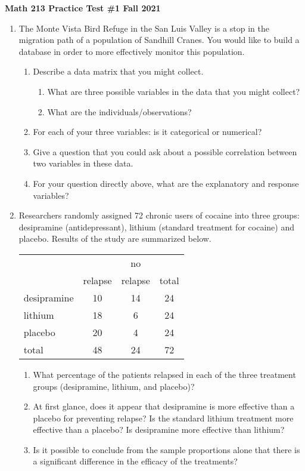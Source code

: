 \documentclass[11pt,fullpage]{amsart}
\begin{document}
\textbf{Math 213 \quad\ddag\quad Practice Test \#1 \quad\ddag\quad Fall 2021}

\hrulefill
\medskip
\begin{enumerate}

\item The Monte Vista Bird Refuge in the San Luis Valley is a stop in the migration path of a population of Sandhill Cranes. You would like to build a database in order to more effectively monitor this population.
\begin{enumerate}
\item Describe a data matrix that you might collect.
  \begin{enumerate}
  \item What are three possible variables in the data that you might collect?
    \item What are the individuals/observations?
\end{enumerate}
\item For each of your three variables: is it categorical or numerical?

\item Give a question that you could ask about a possible correlation between two variables in these data. 

\item For your question directly above, what are the explanatory and response variables?

\end{enumerate}

\vfill

\item Researchers randomly assigned 72 chronic users of cocaine into three groups: desipramine (antidepressant), lithium (standard treatment for cocaine) and placebo. Results of the study are summarized below.

\begin{center}
\begin{tabular}{l | c c | c}
			& 		& no 		&  \\
			& relapse	& relapse	& total \\
\hline
desipramine	& 10		& 14		& 24 \\
lithium		& 18		& 6		& 24 \\
placebo		& 20		& 4		& 24 \\
\hline
total			& 48		& 24		& 72
\end{tabular}
\end{center}

\begin{enumerate}
\item What percentage of the patients relapsed in each of the three treatment groups (desipramine, lithium, and placebo)?
\item At first glance, does it appear that desipramine is more effective than a placebo for preventing relapse? Is the standard lithium treatment more effective than a placebo? Is desipramine more effective than lithium?
  \item Is it possible to conclude from the sample proportions alone that there is a significant difference in the efficacy of the treatments?
\end{enumerate}


\end{enumerate}
\end{document}
